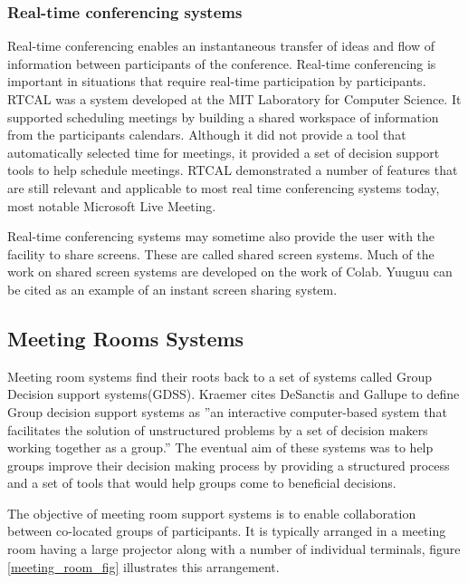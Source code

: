 \subsubsection{Real-time conferencing systems}

Real-time conferencing enables an instantaneous transfer of ideas and
flow of information between participants of the conference. Real-time
conferencing is important in situations that require real-time
participation by participants. RTCAL\cite{SG85} was a system developed
at the MIT Laboratory for Computer Science. It supported scheduling
meetings by building a shared workspace of information from the
participants calendars. Although it did not provide a tool that
automatically selected time for meetings, it provided a set of
decision support tools to help schedule meetings. RTCAL demonstrated a
number of features that are still relevant and applicable to most
real time conferencing systems today, most notable Microsoft Live
Meeting. 

Real-time conferencing systems may sometime also provide the user with
the facility to share screens. These are called shared screen
systems. Much of the work on shared screen systems are developed on
the work of Colab\cite{Stefik:1987:BCU}. Yuuguu can be cited as an
example of an instant screen sharing system.

\subsection{Meeting Rooms Systems}


Meeting room systems find their roots back to a set of systems called
Group Decision support systems(GDSS). Kraemer\cite{KraKin88} cites
DeSanctis and Gallupe\cite{DG85} to define Group decision support
systems as ''an interactive computer-based system that facilitates the
solution of unstructured problems by a set of decision makers working
together as a group.'' The eventual aim of these systems was to help
groups improve their decision making process by providing a structured
process and a set of tools that would help groups come to beneficial
decisions.

The objective of meeting room support systems is to enable
collaboration between co-located groups of participants. It is
typically arranged in a meeting room having a large projector along
with a number of individual terminals, figure \ref{meeting_room_fig}
illustrates this arrangement. 

